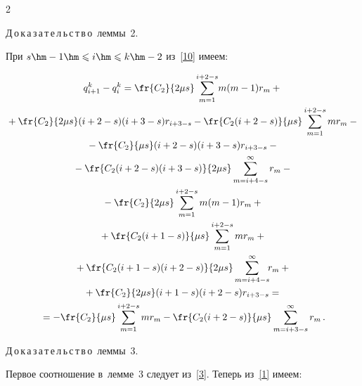 \begin{multicols}{2}
{Д\,о\,к\,а\,з\,а\,т\,е\,л\,ь\,с\,т\,в\,о\ леммы~2.\ 


При $s\hm-1\hm\leqslant i\hm\leqslant k\hm-2$ из~\eqref{10} имеем:


\begin{multline*}


q_{i+1}^k-q_i^k=\fr{C_2}{2\mu s}\sum\limits_{m=1}^{i+2-s}\!m(m-1)r_m+{}\\


{}+


\fr{C_2}{2\mu s}(i+2-s)(i+3-s)r_{i+3-s}-\fr{C_2(i+2-s)}{\mu s}


\sum\limits_{m=1}^{i+2-s}mr_m- {}


\\


{}-\fr{C_2}{\mu s}(i+2-s)(i+3-s)r_{i+3-s}-{}\\


{}-\fr{C_2(i+2-s)(i+3-s)}{2\mu s}


\sum\limits_{m=i+4-s}^{\infty}r_m-{}\\


{}-\fr{C_2}{2\mu s}


\sum\limits_{m=1}^{i+2-s}m(m-1)r_m+{}


\\


{}+\fr{C_2(i+1-s)}{\mu s}\sum\limits_{m=1}^{i+2-s}mr_m+{}\\


{}+


\fr{C_2(i+1-s)(i+2-s)}{2\mu s}\sum\limits_{m=i+4-s}^{\infty}\!\!r_m+{}


\\


{}+\fr{C_2}{2\mu s}(i+1-s)(i+2-s)r_{i+3-s}={}\\


{}=-\fr{C_2}{\mu s}


\sum\limits_{m=1}^{i+2-s}mr_m-\fr{C_2(i+2-s)}{\mu s}


\sum\limits_{m=i+3-s}^{\infty}r_m\,.


\end{multline*}





\noindent


Д\,о\,к\,а\,з\,а\,т\,е\,л\,ь\,с\,т\,в\,о\ леммы~3.





Первое соотношение в~лемме~3 следует из~\eqref{3}. Теперь из~\eqref{1} имеем:


}
\end{multicols}
